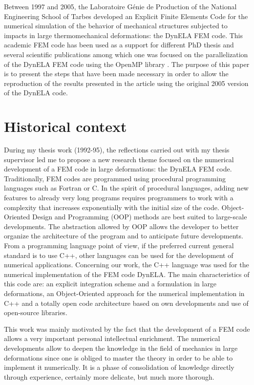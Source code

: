 
Between 1997 and 2005, the Laboratoire G\'enie de Production of the National Engineering School of Tarbes developed an Explicit Finite Elements Code for the numerical simulation of the behavior of mechanical structures subjected to impacts in large thermomechanical deformations: the DynELA FEM code. This academic FEM code has been used as a support for different PhD thesis and several scientific publications \cite{Pantale:2002,Pantale:2004,Menanteau:2006,Nistor:2007,Nistor:2008} among which one was focused on the parallelization of the DynELA FEM code using the OpenMP library \cite{Pantale:2005}. The purpose of this paper is to present the steps that have been made necessary in order to allow the reproduction of the results presented in the article \cite{Pantale:2005} using the original 2005 version of the DynELA code.

\section{Historical context}

During my thesis work (1992-95), the reflections carried out with my thesis supervisor led me to propose a new research theme focused on the numerical development of a FEM code in large deformations: the DynELA FEM code. Traditionally, FEM codes are programmed using procedural programming languages such as Fortran or C. In the spirit of procedural languages, adding new features to already very long programs requires programmers to work with a complexity that increases exponentially with the initial size of the code. Object-Oriented Design and Programming (OOP) methods are best suited to large-scale developments. The abstraction allowed by OOP allows the developer to better organize the architecture of the program and to anticipate future developments. From a programming language point of view, if the preferred current general standard is to use C++, other languages can be used for the development of numerical applications. Concerning our work, the C++ language was used for the numerical implementation of the FEM code DynELA. The main characteristics of this code are: an explicit integration scheme and a formulation in large deformations, an Object-Oriented approach for the numerical implementation in C++ and a totally open code architecture based on own developments and use of open-source libraries.

This work was mainly motivated by the fact that the development of a FEM code allows a very important personal intellectual enrichment. The numerical developments allow to deepen the knowledge in the field of mechanics in large deformations since one is obliged to master the theory in order to be able to implement it numerically. It is a phase of consolidation of knowledge directly through experience, certainly more delicate, but much more thorough.

